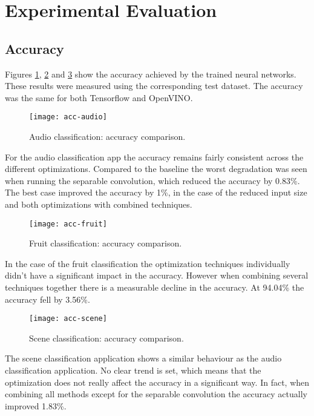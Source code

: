 \section{Experimental Evaluation}

\subsection{Accuracy}

Figures \ref{fig:acc-audio}, \ref{fig:acc-fruit} and \ref{fig:acc-scene} show the accuracy achieved by the trained neural networks. These results were measured using the corresponding test dataset. The accuracy was the same for both Tensorflow and OpenVINO.

\begin{figure}[thbp]
	\centering
	\texttt{[image: acc-audio]}
	\caption{Audio classification: accuracy comparison.}
	\label{fig:acc-audio}
\end{figure}

For the audio classification app the accuracy remains fairly consistent across the different optimizations. Compared to the baseline the worst degradation was seen when running the separable convolution, which reduced the accuracy by 0.83\%. The best case improved the accuracy by 1\%, in the case of the reduced input size and both optimizations with combined techniques.

\begin{figure}[thbp]
	\centering
	\texttt{[image: acc-fruit]}
	\caption{Fruit classification: accuracy comparison.}
	\label{fig:acc-fruit}
\end{figure}

In the case of the fruit classification the optimization techniques individually didn't have a significant impact in the accuracy. However when combining several techniques together there is a measurable decline in the accuracy. At 94.04\% the accuracy fell by 3.56\%.

\begin{figure}[thbp]
	\centering
	\texttt{[image: acc-scene]}
	\caption{Scene classification: accuracy comparison.}
	\label{fig:acc-scene}
\end{figure}

The scene classification application shows a similar behaviour as the audio classification application. No clear trend is set, which means that the optimization does not really affect the accuracy in a significant way. In fact, when combining all methods except for the separable convolution the accuracy actually improved 1.83\%.


